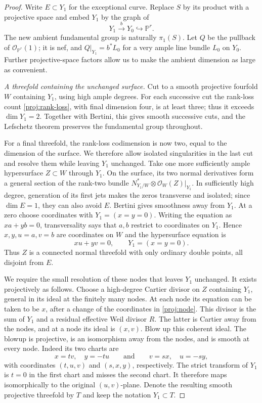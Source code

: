 \documentclass[11pt,reqno]{amsart}
\numberwithin{equation}{section}
\theoremstyle{definition}
\theoremstyle{remark}
\begin{document}
\begin{proof}
Write $E\subset Y_1$ for the exceptional curve.  Replace $S$ by its
product with a projective space and embed $Y_1$ by the graph of
\[
 Y_1\xrightarrow{b}Y_0\hookrightarrow\mathbb P^r.
\]
The new ambient fundamental group is naturally $\pi_1(S)$.  Let $Q$
be the pullback of $\mathcal O_{\mathbb P^r}(1)$; it is nef, and
$Q|_{Y_1}=b^*L_0$ for a very ample line bundle $L_0$ on $Y_0$.
Further projective-space factors allow us to make the ambient dimension
as large as convenient.

 
 \emph{A threefold containing the unchanged surface.}
Cut to a smooth projective fourfold $W$ containing $Y_1$, using high
ample degrees.  For each successive cut the rank-loss count
\eqref{proj:rank-loss}, with final dimension four, is at least three;
thus it exceeds $\dim Y_1=2$.  Together with Bertini, this gives smooth
successive cuts, and the Lefschetz theorem preserves the fundamental
group throughout.

For a final threefold, the rank-loss codimension is now two, equal to
the dimension of the surface.  We therefore allow isolated singularities
in the last cut and resolve them while leaving $Y_1$ unchanged.
Take one more sufficiently ample hypersurface $Z\subset W$ through
$Y_1$.  On the surface, its two normal derivatives form a general
section of the rank-two bundle
$N^*_{Y_1/W}\otimes\mathcal O_W(Z)|_{Y_1}$.  In sufficiently high
degree, generation of its first jets makes the zeros transverse and
isolated; since $\dim E=1$, they can also avoid $E$.  Bertini gives
smoothness away from $Y_1$.  At a zero choose coordinates with
$Y_1=(x=y=0)$.  Writing the equation as $xa+yb=0$, transversality says
that $a,b$ restrict to coordinates on $Y_1$.  Hence $x,y,u=a,v=b$ are
coordinates on $W$ and the hypersurface equation is
\begin{equation}\label{proj:node}
 xu+yv=0,\qquad Y_1=(x=y=0).
\end{equation}
Thus $Z$ is a connected normal threefold with only ordinary double
points, all disjoint from $E$.

We require the small resolution of these nodes that leaves $Y_1$
unchanged.  It exists projectively as follows.  Choose a high-degree
Cartier divisor on $Z$ containing $Y_1$, general in its ideal at the
finitely many nodes.  At each node its equation can be taken to be
$x$, after a change of the coordinates in \eqref{proj:node}.  This
divisor is the sum of $Y_1$ and a residual effective Weil divisor $R$.
The latter is Cartier away from the nodes, and at a node its ideal is
$(x,v)$.  Blow up this coherent ideal.  The blowup is projective, is an
isomorphism away from the nodes, and is smooth at every node.  Indeed
its two charts are
\[
 x=tv,\quad y=-tu
 \qquad\text{and}\qquad
 v=sx,\quad u=-sy,
\]
with coordinates $(t,u,v)$ and $(s,x,y)$, respectively.  The strict
transform of $Y_1$ is $t=0$ in the first chart and misses the second
chart.  It therefore maps isomorphically to the original $(u,v)$-plane.
Denote the resulting smooth projective threefold by $T$ and keep the
notation $Y_1\subset T$.


\end{proof}
\end{document}
